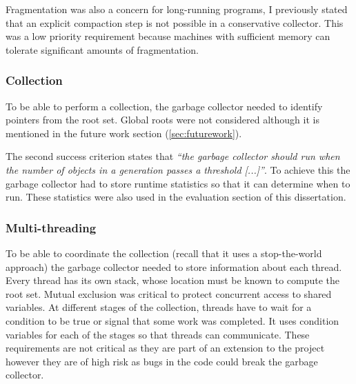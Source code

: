 \documentclass[../diss.tex]{subfiles}
\begin{document}
Fragmentation was also a concern for long-running programs, I previously stated that an explicit compaction step is not possible in a conservative collector. This was a low priority requirement because machines with sufficient memory can tolerate significant amounts of fragmentation.

\subsubsection{Collection}

To be able to perform a collection, the garbage collector needed to identify pointers from the root set. Global roots were not considered although it is mentioned in the future work section (\cref{sec:futurework}).

The second success criterion states that \emph{``the garbage collector should run when the number of objects in a generation passes a threshold [...]''}. To achieve this the garbage collector had to store runtime statistics so that it can determine when to run. These statistics were also used in the evaluation section of this dissertation.

\subsubsection{Multi-threading}

To be able to coordinate the collection (recall that it uses a stop-the-world approach) the garbage collector needed to store information about each thread. Every thread has its own stack, whose location must be known to compute the root set. Mutual exclusion was critical to protect concurrent access to shared variables. At different stages of the collection, threads have to wait for a condition to be true or signal that some work was completed. It uses condition variables for each of the stages so that threads can communicate. These requirements are not critical as they are part of an extension to the project however they are of high risk as bugs in the code could break the garbage collector.
\end{document}
